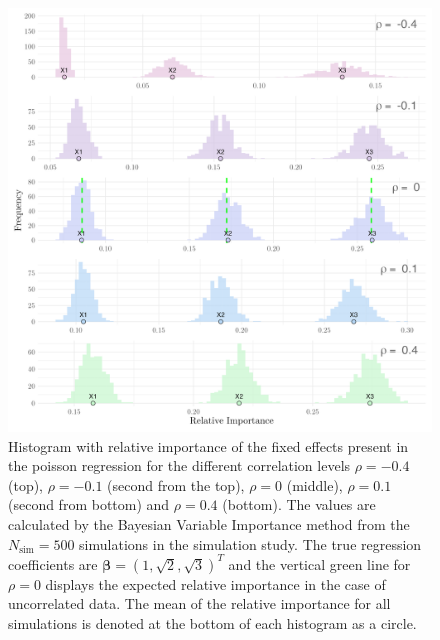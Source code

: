 \begin{figure}[H]
  \centering
  \includegraphics[width=1.1\linewidth]{Figures/Simulation study/Fixed_combined_poisson.png}
  \caption[Relative importance of the fixed effects in Poisson GLMM]{Histogram with relative importance of the fixed effects present in the poisson regression for the different correlation levels $\rho=-0.4$ (top), $\rho=-0.1$ (second from the top), $\rho=0$ (middle), $\rho=0.1$ (second from bottom) and $\rho=0.4$ (bottom). The values are calculated by the Bayesian Variable Importance method from the $N_{\text{sim}}=500$ simulations in the simulation study. The true regression coefficients are $\boldsymbol{\beta}=(1, \sqrt{2}, \sqrt{3})^T$ and the vertical green line for $\rho=0$ displays the expected relative importance in the case of uncorrelated data. The mean of the relative importance for all simulations is denoted at the bottom of each histogram as a circle.}
  \label{fig:fixed_combined_poisson}
\end{figure}
